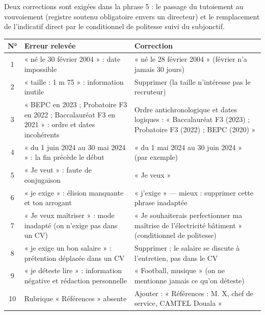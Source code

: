 \documentclass[11pt]{article}
\begin{document}
\begin{attention}
Deux corrections sont exigées dans la phrase 5 : le passage du tutoiement au vouvoiement (registre soutenu obligatoire envers un directeur) et le remplacement de l'indicatif direct par le conditionnel de politesse suivi du subjonctif.
\end{attention}

\begin{corrige}
\begin{center}
\begin{tabularx}{\linewidth}{|c|X|X|}
\hline
\rowcolor{popblueL} N° & Erreur relevée & Correction \\
\hline
1 & « né le 30 février 2004 » : date impossible & « né le 28 février 2004 » (février n'a jamais 30 jours) \\
\hline
2 & « taille : 1 m 75 » : information inutile & Supprimer (la taille n'intéresse pas le recruteur) \\
\hline
3 & « BEPC en 2023 ; Probatoire F3 en 2022 ; Baccalauréat F3 en 2021 » : ordre et dates incohérents & Ordre antichronologique et dates logiques : « Baccalauréat F3 (2023) ; Probatoire F3 (2022) ; BEPC (2020) » \\
\hline
4 & « du 1\ier{} juin 2024 au 30 mai 2024 » : la fin précède le début & « du 1\ier{} mai 2024 au 30 juin 2024 » (par exemple) \\
\hline
5 & « Je veut » : faute de conjugaison & « Je veux » \\
\hline
6 & « je exige » : élision manquante et ton arrogant & « j'exige » — mieux : supprimer cette phrase inadaptée \\
\hline
7 & « Je veux maîtriser » : mode inadapté (on n'exige pas dans un CV) & « Je souhaiterais perfectionner ma maîtrise de l'électricité bâtiment » (conditionnel de politesse) \\
\hline
8 & « je exige un bon salaire » : prétention déplacée dans un CV & Supprimer ; le salaire se discute à l'entretien, pas dans le CV \\
\hline
9 & « je déteste lire » : information négative et rédaction personnelle & « Football, musique » (on ne mentionne jamais ce qu'on déteste) \\
\hline
10 & Rubrique « Références » absente & Ajouter : « Références : M. X, chef de service, CAMTEL Douala » \\
\hline
\end{tabularx}
\end{center}
\end{corrige}
\end{document}
